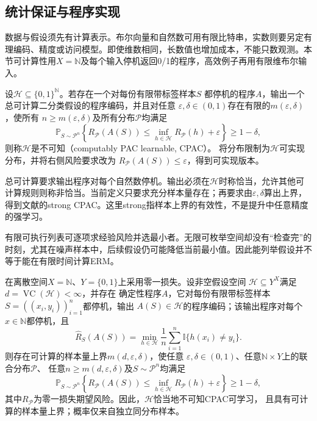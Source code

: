 \subsection{统计保证与程序实现}

数据与假设须先有计算表示。布尔向量和自然数可用有限比特串，实数则要另定有理编码、精度或访问模型。即使维数相同，长数值也增加成本，不能只数观测。本节可计算性用$X=\mathbb N$及每个输入停机返回0/1的程序，高效例子再用有限维布尔输入。

\begin{definition}[可计算PAC学习]
\label{def:binary-computable-pac}
设$\mathcal H\subseteq\{0,1\}^{\mathbb N}$。若存在一个对每份有限带标签样本$S$
都停机的程序$A$，输出一个总可计算二分类假设的程序编码，并且对任意
$\varepsilon,\delta\in(0,1)$存在有限的$m(\varepsilon,\delta)$，使所有
$n\geq m(\varepsilon,\delta)$及所有分布$\mathcal P$均满足
\[
 \mathbb P_{S\sim\mathcal P^n}\left\{
 R_{\mathcal P}(A(S))\leq\inf_{h\in\mathcal H}R_{\mathcal P}(h)+\varepsilon
 \right\}\geq1-\delta,
\]
则称$\mathcal H$是不可知（computably PAC learnable, CPAC）。
将分布限制为$\mathcal H$可实现分布，并将右侧风险要求改为
$R_{\mathcal P}(A(S))\leq\varepsilon$，得到可实现版本。
\end{definition}

总可计算要求输出程序对每个自然数停机。输出必须在$\mathcal H$时称恰当，允许其他可计算规则则称非恰当。当前定义只要求充分样本量存在；再要求由$\varepsilon,\delta$算出上界，得到文献的strong CPAC。这里strong指样本上界的有效性，不是提升中任意精度的强学习。

有限可执行列表可逐项求经验风险并选最小者。无限可枚举空间却没有“检查完”的时刻，尤其在噪声样本中，后续假设仍可能降低当前最小值。因此能列举假设并不等于能在有限时间计算ERM。

\begin{theorem}[可计算ERM给出的学习保证]
\label{thm:computable-erm-pac}
在离散空间$X=\mathbb N$、$Y=\{0,1\}$上采用零一损失。设非空假设空间
$\mathcal H\subseteq Y^X$满足$d=\operatorname{VC}(\mathcal H)<\infty$，并存在
确定性程序$A$，它对每份有限带标签样本$S=((x_i,y_i))_{i=1}^n$都停机，输出
$A(S)\in\mathcal H$的程序编码；该输出程序对每个$x\in\mathbb N$都停机，且
\[
 \hat R_S(A(S))
 =\min_{h\in\mathcal H}\frac1n\sum_{i=1}^n\mathbb I\{h(x_i)\neq y_i\}.
\]
则存在可计算的样本量上界$m(d,\varepsilon,\delta)$，使任意
$\varepsilon,\delta\in(0,1)$、任意$\mathbb N\times Y$上的联合分布$\mathcal P$、
任意$n\geq m(d,\varepsilon,\delta)$及$S\sim\mathcal P^n$均满足
\[
 \mathbb P_{S\sim\mathcal P^n}\left\{
 R_{\mathcal P}(A(S))
 \leq\inf_{h\in\mathcal H}R_{\mathcal P}(h)+\varepsilon
 \right\}\geq1-\delta,
\]
其中$R_{\mathcal P}$为零一损失期望风险。因此，$\mathcal H$恰当地不可知CPAC可学习，
且具有可计算的样本量上界；概率仅来自独立同分布样本。
\end{theorem}

